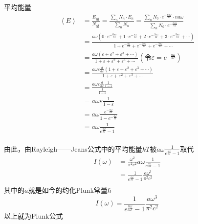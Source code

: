 \documentclass[lang=cn,15pt]{elegantbook}
\begin{document}
平均能量\begin{equation}
	\begin{split}
		\left< E \right> &=\frac{E_{\text{总}}}{N_{\text{总}}}=\frac{\sum_n{N_n\cdot E_n}}{\sum_n{N_n}}=\frac{\sum_n{N_0\cdot e^{-\frac{na\omega}{kT}}\cdot na\omega}}{\sum_n{N_0\cdot e^{-\frac{na\omega}{kT}}}}
		\\
		&=\frac{a\omega \left( 0\cdot e^{-\frac{0a\omega}{kT}}+1\cdot e^{-\frac{a\omega}{kT}}+2\cdot e^{-\frac{2a\omega}{kT}}+3\cdot e^{-\frac{3a\omega}{kT}}+\cdots \right)}{1+e^{-\frac{a\omega}{kT}}+e^{-\frac{2a\omega}{kT}}+e^{-\frac{3a\omega}{kT}}+\cdots}
		\\
		&=\frac{a\omega \left( \varepsilon +\varepsilon ^2+\varepsilon ^3+\cdots \right)}{1+\varepsilon +\varepsilon ^2+\varepsilon ^3+\cdots}\left( \text{令}\varepsilon =e^{-\frac{a\omega}{kT}} \right) 
		\\
		&=\frac{a\omega \varepsilon \frac{d}{d\varepsilon}\left( 1+\varepsilon +\varepsilon ^2+\varepsilon ^3+\cdots \right)}{1+\varepsilon +\varepsilon ^2+\varepsilon ^3+\cdots}
		\\
		&=\frac{a\omega \varepsilon \frac{d}{d\varepsilon}\frac{1}{1-\varepsilon}}{\frac{1}{1-\varepsilon}}
		\\
		&=a\omega \varepsilon \frac{1}{1-\varepsilon}
		\\
		&=a\omega \frac{e^{-\frac{a\omega}{kT}}}{1-e^{-\frac{a\omega}{kT}}}
		\\
		&=a\omega \frac{1}{e^{\frac{a\omega}{kT}}-1}
		\\
	\end{split}
\end{equation}

由此，由Rayleigh——Jeans公式中的平均能量$kT$被$a\omega \frac{1}{e^{\frac{a\omega}{kT}}-1}$取代
\begin{equation}
	\begin{split}
		I\left( \omega \right) &=\frac{\omega ^2}{\pi ^2c^2}a\omega \frac{1}{e^{\frac{a\omega}{kT}}-1}
		\\
		&=\frac{1}{e^{\frac{a\omega}{kT}}-1}\frac{a\omega ^3}{\pi ^2c^2}
		\\
	\end{split}
\end{equation}
其中的$a$就是如今的约化Plunk常量$\hbar $
\begin{equation}
		I\left( \omega \right)=\frac{1}{e^{\frac{\hbar\omega}{kT}}-1}\frac{a\omega ^3}{\pi ^2c^2}
\end{equation}
以上就为Plunk公式
\end{document}
